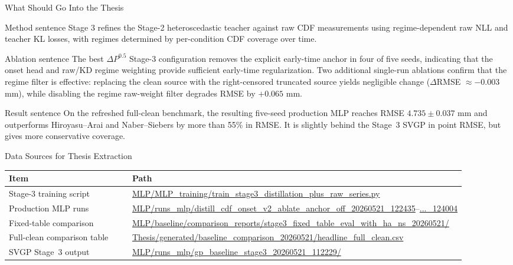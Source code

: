 \documentclass[UTF8,aspectratio=169]{ctexbeamer}
\begin{document}
\begin{frame}{What Should Go Into the Thesis}
\small
\begin{block}{Method sentence}
Stage 3 refines the Stage-2 heteroscedastic teacher against raw CDF measurements using regime-dependent raw NLL and teacher KL losses, with regimes determined by per-condition CDF coverage over time.
\end{block}

\begin{block}{Ablation sentence}
The best \(\Delta P^{0.5}\) Stage-3 configuration removes the explicit early-time anchor in four of five seeds, indicating that the onset head and raw/KD regime weighting provide sufficient early-time regularization. Two additional single-run ablations confirm that the regime filter is effective: replacing the clean source with the right-censored truncated source yields negligible change (\(\Delta\)RMSE \(\approx-0.003\) mm), while disabling the regime raw-weight filter degrades RMSE by \(+0.065\) mm.
\end{block}

\begin{block}{Result sentence}
On the refreshed full-clean benchmark, the resulting five-seed production MLP
reaches RMSE \(4.735\pm0.037\) mm and outperforms Hiroyasu--Arai and
Naber--Siebers by more than 55\% in RMSE. It is slightly behind the Stage~3
SVGP in point RMSE, but gives more conservative coverage.
\end{block}
\end{frame}

\begin{frame}{Data Sources for Thesis Extraction}
\small
\begin{tabular}{L{0.30\linewidth}L{0.60\linewidth}}
\toprule
Item & Path \\
\midrule
Stage-3 training script & \scriptsize\url{MLP/MLP_training/train_stage3_distillation_plus_raw_series.py} \\
Production MLP runs & \scriptsize\url{MLP/runs_mlp/distill_cdf_onset_v2_ablate_anchor_off_20260521_122435}--\url{..._124004} \\
Fixed-table comparison & \scriptsize\url{MLP/baseline/comparison_reports/stage3_fixed_table_eval_with_ha_ns_20260521/} \\
Full-clean comparison table & \scriptsize\url{Thesis/generated/baseline_comparison_20260521/headline_full_clean.csv} \\
SVGP Stage~3 output & \scriptsize\url{MLP/runs_mlp/gp_baseline_stage3_20260521_112229/} \\
\bottomrule
\end{tabular}
\end{frame}
\end{document}
